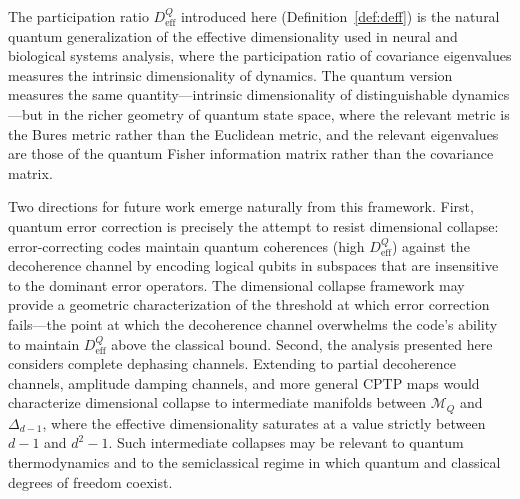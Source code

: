 \documentclass[12pt,a4paper]{article}
\theoremstyle{definition}
\theoremstyle{remark}
\begin{document}
The participation ratio $D_{\mathrm{eff}}^Q$ introduced here (Definition~\ref{def:deff}) is the natural quantum generalization of the effective dimensionality used in neural and biological systems analysis, where the participation ratio of covariance eigenvalues measures the intrinsic dimensionality of dynamics. The quantum version measures the same quantity---intrinsic dimensionality of distinguishable dynamics---but in the richer geometry of quantum state space, where the relevant metric is the Bures metric rather than the Euclidean metric, and the relevant eigenvalues are those of the quantum Fisher information matrix rather than the covariance matrix.

Two directions for future work emerge naturally from this framework. First, quantum error correction is precisely the attempt to resist dimensional collapse: error-correcting codes maintain quantum coherences (high $D_{\mathrm{eff}}^Q$) against the decoherence channel by encoding logical qubits in subspaces that are insensitive to the dominant error operators. The dimensional collapse framework may provide a geometric characterization of the threshold at which error correction fails---the point at which the decoherence channel overwhelms the code's ability to maintain $D_{\mathrm{eff}}^Q$ above the classical bound. Second, the analysis presented here considers complete dephasing channels. Extending to partial decoherence channels, amplitude damping channels, and more general CPTP maps would characterize dimensional collapse to intermediate manifolds between $\mathcal{M}_Q$ and $\Delta_{d-1}$, where the effective dimensionality saturates at a value strictly between $d - 1$ and $d^2 - 1$. Such intermediate collapses may be relevant to quantum thermodynamics and to the semiclassical regime in which quantum and classical degrees of freedom coexist.



\end{document}
